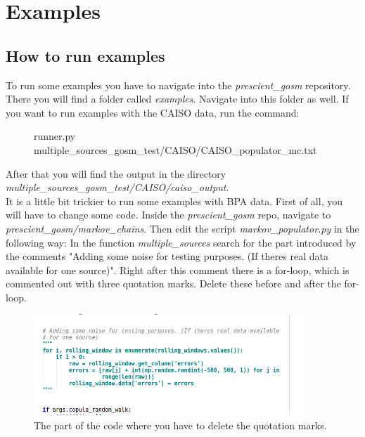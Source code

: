 \section{Examples}

\subsection{How to run examples}

To run some examples you have to navigate into the \emph{prescient\_gosm} repository. There you  will find a folder called \emph{examples}. Navigate into this folder as well. If you want to run examples with the CAISO data, run the command:\\

\begin{figure}[H]
	\begin{framed}
		runner.py multiple\_sources\_gosm\_test/CAISO/CAISO\_populator\_mc.txt
	\end{framed}
\end{figure}

After that you will find the output in the directory \emph{multiple\_sources\_gosm\_test/CAISO/caiso\_output}.\\

It is a little bit trickier to run some examples with BPA data. First of all, you will  have to change some code. Inside the \emph{prescient\_gosm} repo, navigate to \emph{prescient\_gosm/markov\_chains}. Then edit the script \emph{markov\_populator.py} in the following way: In the function \emph{multiple\_sources} search for the part introduced by the comments "Adding some noise for testing purposes. (If theres real data available for one source)". Right after this comment there is a for-loop, which is commented out with three quotation marks. Delete these before and after the for-loop.\\

\begin{figure}[H]
	\centering
	\includegraphics[width=0.9\textwidth]{code.png}
	\caption{The part of the code where you have to delete the quotation marks.}
\end{figure}

